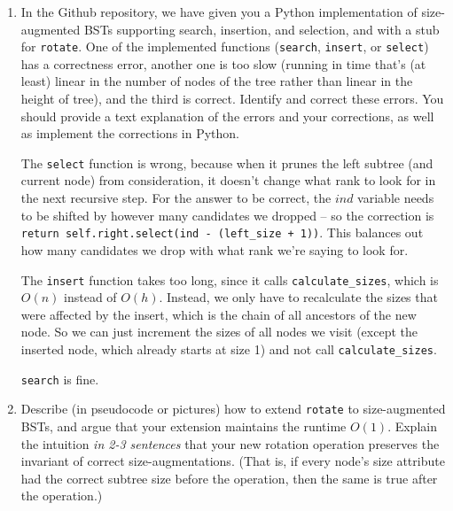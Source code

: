 \documentclass[11pt]{article}
\begin{document}
\begin{enumerate}
    \begin{enumerate}
        \item In the Github repository, we have given you a Python implementation of size-augmented BSTs supporting search, insertion, and selection, and with a stub for \texttt{rotate}. One of the implemented functions (\texttt{search}, \texttt{insert}, or \texttt{select}) has a correctness error, another one is too slow (running in time that's (at least) linear in the number of nodes of the tree rather than linear in the height of tree), and the third is correct. 
        Identify and correct these errors. You should provide a text explanation of the errors and your corrections, as well as implement the corrections in Python.    

        \begin{mysolution}
        	\qquad The \texttt{select} function is wrong, because when it prunes the left subtree (and current node) from consideration, it doesn't change what rank to look for in the next recursive step. For the answer to be correct, the $ind$ variable needs to be shifted by however many candidates we dropped -- so the correction is \texttt{return self.right.select(ind - (left\_size + 1))}. This balances out how many candidates we drop with what rank we're saying to look for.
        	
        	\qquad The \texttt{insert} function takes too long, since it calls \texttt{calculate\_sizes}, which is $O(n)$ instead of $O(h)$.  Instead, we only have to recalculate the sizes that were affected by the insert, which is the chain of all ancestors of the new node. So we can just increment the sizes of all nodes we visit (except the inserted node, which already starts at size 1) and not call \texttt{calculate\_sizes}.
        	
        	\qquad \texttt{search} is fine.
        \end{mysolution}


        \item 
        
        Describe (in pseudocode or pictures) how to extend \texttt{rotate} to size-augmented BSTs, and argue that your extension maintains the runtime $O(1)$. Explain the intuition \textit{in 2-3 sentences} that your new rotation operation preserves the invariant of correct size-augmentations. (That is, if every node's size attribute had the correct subtree size before the operation, then the same is true after the operation.)


\end{enumerate}
\end{enumerate}
\end{document}
